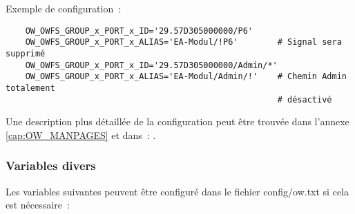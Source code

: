 \begin{description}
Exemple de configuration~:
\begin{example}
\begin{verbatim}
    OW_OWFS_GROUP_x_PORT_x_ID='29.57D305000000/P6'
    OW_OWFS_GROUP_x_PORT_x_ALIAS='EA-Modul/!P6'        # Signal sera supprimé
    OW_OWFS_GROUP_x_PORT_x_ID='29.57D305000000/Admin/*'
    OW_OWFS_GROUP_x_PORT_x_ALIAS='EA-Modul/Admin/!'    # Chemin Admin totalement
                                                       # désactivé
\end{verbatim}
\end{example}

Une description plus détaillée de la configuration peut être trouvée dans l'annexe
\flqq{}\ref{cap:OW_MANPAGES}\frqq{} et dans~: .

\end{description}

{
\subsubsection{Variables divers}
}
Les variables suivantes peuvent être configuré dans le fichier config/ow.txt si cela
est nécessaire~:

